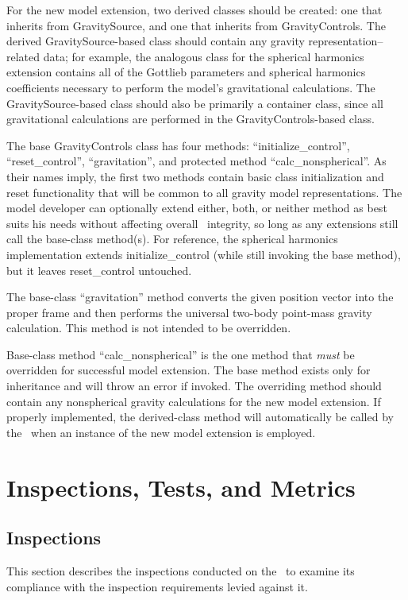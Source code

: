 For the new model extension, two derived classes should be created: one that
inherits from GravitySource, and one that inherits from GravityControls. The
derived GravitySource-based class should contain any gravity representation--
related data; for example, the analogous class for the spherical harmonics
extension contains all of the Gottlieb parameters and spherical harmonics
coefficients necessary to perform the model's gravitational calculations.
The GravitySource-based class should also be primarily a container class, since
all gravitational calculations are performed in the GravityControls-based class.

The base GravityControls class has four methods: ``initialize\_control'',
``reset\_control'', ``gravitation'', and protected method
``calc\_nonspherical''. As their names imply, the first two methods contain
basic class initialization and reset functionality that will be common to all
gravity model representations. The model developer can optionally extend
either, both, or neither method as best suits his needs without affecting
overall \ModelDesc\ integrity, so long as any extensions still call the
base-class method(s). For reference, the spherical harmonics
implementation extends initialize\_control (while still invoking the base
method), but it leaves reset\_control untouched.

The base-class ``gravitation'' method converts the given position vector
into the proper frame and then performs the universal two-body point-mass
gravity calculation. This method is not intended to be overridden.

Base-class method ``calc\_nonspherical'' is the one method that \emph{must}
be overridden for successful model extension. The base method exists only for
inheritance and will throw an error if invoked. The overriding method
should contain any nonspherical gravity calculations for the new model
extension. If properly implemented, the derived-class method will
automatically be called by the \ModelDesc\ when an instance of the new
model extension is employed.


\chapter{Inspections, Tests, and Metrics}\label{ch:ivv}

\section{Inspections}
This section describes the inspections conducted on the \ModelDesc\ to
examine its compliance with the inspection requirements levied against it.


